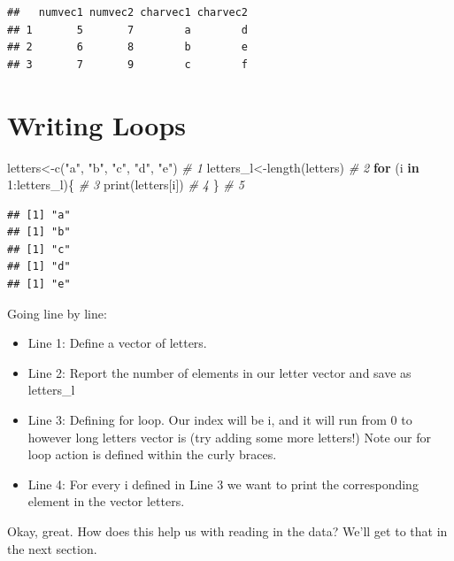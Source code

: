 \documentclass[
]{book}
\newenvironment{Shaded}{\begin{snugshade}}{\end{snugshade}}
\newcommand{\CommentTok}[1]{\textcolor[rgb]{0.56,0.35,0.01}{\textit{#1}}}
\newcommand{\ControlFlowTok}[1]{\textcolor[rgb]{0.13,0.29,0.53}{\textbf{#1}}}
\newcommand{\DecValTok}[1]{\textcolor[rgb]{0.00,0.00,0.81}{#1}}
\newcommand{\FunctionTok}[1]{\textcolor[rgb]{0.00,0.00,0.00}{#1}}
\newcommand{\NormalTok}[1]{#1}
\newcommand{\OtherTok}[1]{\textcolor[rgb]{0.56,0.35,0.01}{#1}}
\newcommand{\SpecialCharTok}[1]{\textcolor[rgb]{0.00,0.00,0.00}{#1}}
\newcommand{\StringTok}[1]{\textcolor[rgb]{0.31,0.60,0.02}{#1}}
\providecommand{\tightlist}{%
  \setlength{\itemsep}{0pt}\setlength{\parskip}{0pt}}
\begin{document}
\begin{verbatim}
##   numvec1 numvec2 charvec1 charvec2
## 1       5       7        a        d
## 2       6       8        b        e
## 3       7       9        c        f
\end{verbatim}

\hypertarget{writing-loops}{%
\section{Writing Loops}\label{writing-loops}}

\begin{Shaded}
\begin{Highlighting}[numbers=left,,]
\NormalTok{letters}\OtherTok{\textless{}{-}}\FunctionTok{c}\NormalTok{(}\StringTok{"a"}\NormalTok{, }\StringTok{"b"}\NormalTok{, }\StringTok{"c"}\NormalTok{, }\StringTok{"d"}\NormalTok{, }\StringTok{"e"}\NormalTok{)  }\CommentTok{\# 1}
\NormalTok{letters\_l}\OtherTok{\textless{}{-}}\FunctionTok{length}\NormalTok{(letters)           }\CommentTok{\# 2}
\ControlFlowTok{for}\NormalTok{ (i }\ControlFlowTok{in} \DecValTok{1}\SpecialCharTok{:}\NormalTok{letters\_l)\{              }\CommentTok{\# 3}
  \FunctionTok{print}\NormalTok{(letters[i])                  }\CommentTok{\# 4}
\NormalTok{\}                                    }\CommentTok{\# 5}
\end{Highlighting}
\end{Shaded}

\begin{verbatim}
## [1] "a"
## [1] "b"
## [1] "c"
## [1] "d"
## [1] "e"
\end{verbatim}

Going line by line:

\begin{itemize}
\tightlist
\item
  Line 1: Define a vector of letters.
\item
  Line 2: Report the number of elements in our letter vector and save as letters\_l
\item
  Line 3: Defining for loop. Our index will be i, and it will run from 0 to however long letters vector is (try adding some more letters!) Note our for loop action is defined within the curly braces.
\item
  Line 4: For every i defined in Line 3 we want to print the corresponding element in the vector letters.
\end{itemize}

Okay, great. How does this help us with reading in the data? We'll get to that in the next section.
\end{document}

